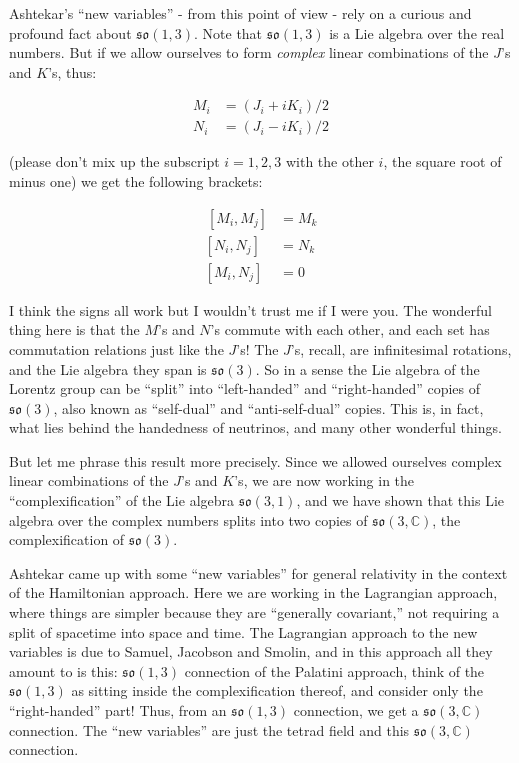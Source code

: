 \documentclass{article}
\begin{document}
Ashtekar's ``new variables'' - from this point of view - rely on a
curious and profound fact about \(\mathfrak{so}(1,3)\). Note that
\(\mathfrak{so}(1,3)\) is a Lie algebra over the real numbers. But if we
allow ourselves to form \emph{complex} linear combinations of the
\(J\)'s and \(K\)'s, thus:

\[\begin{aligned}M_i &= (J_i + iK_i)/2 \\ N_i &= (J_i - iK_i)/2\end{aligned}\]

(please don't mix up the subscript \(i = 1,2,3\) with the other \(i\),
the square root of minus one) we get the following brackets:

\[\begin{aligned}\,[M_i,M_j] &= M_k \\ [N_i,N_j] &= N_k \\ [M_i,N_j] &= 0\end{aligned}\]

I think the signs all work but I wouldn't trust me if I were you. The
wonderful thing here is that the \(M\)'s and \(N\)'s commute with each
other, and each set has commutation relations just like the \(J\)'s! The
\(J\)'s, recall, are infinitesimal rotations, and the Lie algebra they
span is \(\mathfrak{so}(3)\). So in a sense the Lie algebra of the
Lorentz group can be ``split'' into ``left-handed'' and ``right-handed''
copies of \(\mathfrak{so}(3)\), also known as ``self-dual'' and
``anti-self-dual'' copies. This is, in fact, what lies behind the
handedness of neutrinos, and many other wonderful things.

But let me phrase this result more precisely. Since we allowed ourselves
complex linear combinations of the \(J\)'s and \(K\)'s, we are now
working in the ``complexification'' of the Lie algebra
\(\mathfrak{so}(3,1)\), and we have shown that this Lie algebra over the
complex numbers splits into two copies of
\(\mathfrak{so}(3,\mathbb{C})\), the complexification of
\(\mathfrak{so}(3)\).

Ashtekar came up with some ``new variables'' for general relativity in
the context of the Hamiltonian approach. Here we are working in the
Lagrangian approach, where things are simpler because they are
``generally covariant,'' not requiring a split of spacetime into space
and time. The Lagrangian approach to the new variables is due to Samuel,
Jacobson and Smolin, and in this approach all they amount to is this:
\(\mathfrak{so}(1,3)\) connection of the Palatini approach, think of the
\(\mathfrak{so}(1,3)\) as sitting inside the complexification thereof,
and consider only the ``right-handed'' part! Thus, from an
\(\mathfrak{so}(1,3)\) connection, we get a
\(\mathfrak{so}(3,\mathbb{C})\) connection. The ``new variables'' are
just the tetrad field and this \(\mathfrak{so}(3,\mathbb{C})\)
connection.
\end{document}
